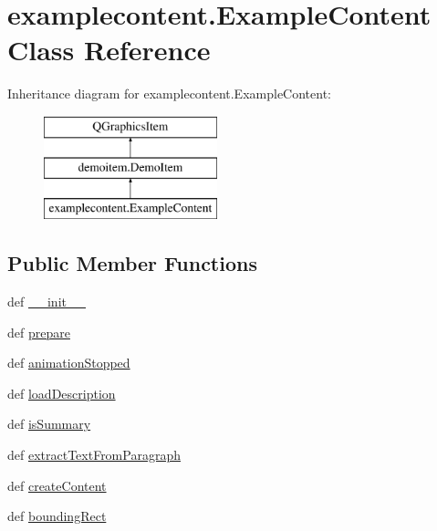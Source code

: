 \hypertarget{classexamplecontent_1_1ExampleContent}{}\section{examplecontent.\+Example\+Content Class Reference}
\label{classexamplecontent_1_1ExampleContent}
Inheritance diagram for examplecontent.\+Example\+Content\+:\begin{figure}[H]
\begin{center}
\leavevmode
\includegraphics[height=3.000000cm]{classexamplecontent_1_1ExampleContent}
\end{center}
\end{figure}
\subsection*{Public Member Functions}
\begin{DoxyCompactItemize}
\item 
def \hyperlink{classexamplecontent_1_1ExampleContent_a8dd2f90eece06fe110711c472bb269ee}{\+\_\+\+\_\+init\+\_\+\+\_\+}
\item 
def \hyperlink{classexamplecontent_1_1ExampleContent_a497f072bc3fea07381aa3f3bfd4fd2bf}{prepare}
\item 
def \hyperlink{classexamplecontent_1_1ExampleContent_a8a07dfb66f70c1569c9383dc5eea10c9}{animation\+Stopped}
\item 
def \hyperlink{classexamplecontent_1_1ExampleContent_a81aaf9ff55bb3e0bcaf0c6a40ad6c584}{load\+Description}
\item 
def \hyperlink{classexamplecontent_1_1ExampleContent_ade9c47c9bb94457467d8c9f9431dc533}{is\+Summary}
\item 
def \hyperlink{classexamplecontent_1_1ExampleContent_a72a980a55b40f1015af562ea4efc0d35}{extract\+Text\+From\+Paragraph}
\item 
def \hyperlink{classexamplecontent_1_1ExampleContent_af714dd53aaa8dc93958c90f3ce029c00}{create\+Content}
\item 
def \hyperlink{classexamplecontent_1_1ExampleContent_ace614767b53cdfc97c050f1a24454210}{bounding\+Rect}
\end{DoxyCompactItemize}
